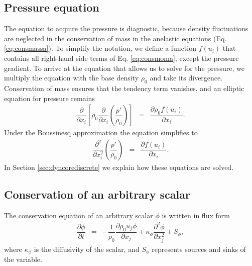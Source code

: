 \documentclass[gmd]{copernicus}
\begin{document}
\subsection{Pressure equation}
The equation to acquire the pressure is diagnostic, because density fluctuations are neglected in the conservation of mass in the anelastic equations (Eq. \ref{eq:consmassa}). To simplify the notation, we define a function $f \left( u_i \right)$ that contains all right-hand side terms of Eq. \ref{eq:consmoma}, except the pressure gradient. To arrive at the equation that allows us to solve for the pressure, we multiply the equation with the base density $\rho_0$ and take its divergence. Conservation of mass ensures that the tendency term vanishes, and an elliptic equation for pressure remains
\begin{eqnarray}
\dfrac{\partial}{\partial x_i} 
\left[ \rho_0 \dfrac{\partial}{\partial x_i} \left( \dfrac{p'}{\rho_0} \right) \right] & = &
\dfrac{\partial \rho_0 f \left( u_i \right)}{\partial x_i}.\label{eq:presa}
\end{eqnarray}
Under the Boussinesq approximation the equation simplifies to
\begin{eqnarray}
\dfrac{\partial^2}{\partial x_i^2} \left( \dfrac{p'}{\rho_0} \right) & = &
\dfrac{\partial f \left( u_i \right)}{\partial x_i}.\label{eq:presb}
\end{eqnarray}
In Section \ref{sec:dyncorediscrete} we explain how these equations are solved.

\subsection{Conservation of an arbitrary scalar}
The conservation equation of an arbitrary scalar $\phi$ is written in flux form
\begin{eqnarray}
\dfrac{\partial \phi}{\partial t} & = & - \dfrac{1}{\rho_0} \dfrac{\partial \rho_0 u_j \phi}{\partial x_j} +
\kappa_\phi \dfrac{\partial^2 \phi}{\partial x_j^2} + S_\phi, \label{eq:consscal}
\end{eqnarray}
where $\kappa_\phi$ is the diffusivity of the scalar, and $S_\phi$ represents sources and sinks of the variable.
\end{document}
